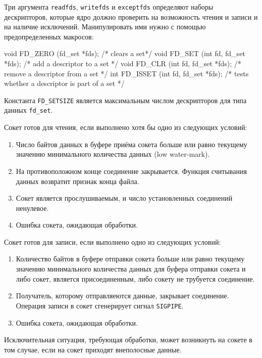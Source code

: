 Три аргумента \lstinline{readfds}, \lstinline{writefds} и \lstinline{exceptfds} определяют наборы дескрипторов, которые ядро должно проверить на возможность чтения и записи и на наличие исключений. Манипулировать ими нужно с помощью предопределенных макросов:
\begin{clst}{}{}
void FD_ZERO (fd_set *fds);           /* clears a set*/
void FD_SET (int fd, fd_set *fds);    /* add a descriptor to a set */
void FD_CLR (int fd, fd_set *fds);    /* remove a descriptor from a set */
int FD_ISSET (int fd, fd_set *fds);   /* tests whether a descriptor is part of a set */
\end{clst}

Константа \lstinline{FD_SETSIZE} является максимальным числом дескрипторов для типа данных \lstinline{fd_set}.

Сокет готов для чтения, если выполнено хотя бы одно из следующих условий:
\begin{enumerate}
  \item Число байтов данных в буфере приёма сокета больше или равно текущему значению минимального количества данных (low water-mark).
  \item На противоположном конце соединение закрывается. Функция считывания данных возвратит признак конца файла.
  \item Сокет является прослушиваемым, и число установленных соединений ненулевое.
  \item Ошибка сокета, ожидающая обработки.
\end{enumerate}

Сокет готов для записи, если выполнено одно из следующих условий:
\begin{enumerate}
  \item Количество байтов в буфере отправки сокета больше или равно текущему значению минимального количества данных для буфера отправки сокета и либо сокет, является присоединенным, либо сокету не трубуется соединение.
  \item Получатель, которому отправляеются данные, закрывает соединение. Операция записи в сокет сгенерирует сигнал \lstinline{SIGPIPE}.
  \item Ошибка сокета, ожидающая обработки.
\end{enumerate}

Исключительная ситуация, требующая обработки, может возникнуть на сокете в том случае, если на сокет приходят внеполосные данные.

